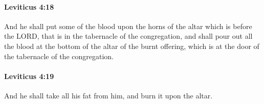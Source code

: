 		\paragraph{Leviticus 4:18} %
			\label{LEVITICUS-4-18}

			And he shall put some of the blood upon the horns of the altar which is before the LORD, that is in the tabernacle of the congregation, and shall pour out all the blood at the bottom of the altar of the burnt offering, which is at the door of the tabernacle of the congregation.


		\paragraph{Leviticus 4:19} %
			\label{LEVITICUS-4-19}

			And he shall take all his fat from him, and burn it upon the altar.


